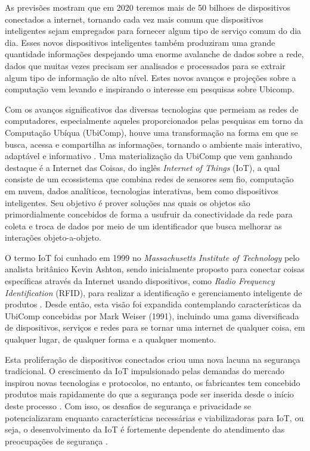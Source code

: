\documentclass[tid,table]{texufpel} %
\begin{document}
As previsões mostram que em 2020 teremos mais de 50 bilhoes de dispositivos conectados a internet, tornando cada vez mais comum que dispositivos inteligentes sejam empregados para fornecer algum tipo de serviço comum do dia dia. Esses novos dispositivos inteligentes também produziram uma grande quantidade  informações despejando uma enorme avalanche de dados sobre a rede, dados que muitas vezes precisam ser analisados e processados para se extrair algum tipo de informação de alto nível. Estes novos avanços e projeções sobre a computação vem levando e inspirando o interesse em pesquisas sobre Ubicomp. 






Com os avanços significativos das diversas tecnologias que permeiam as redes de computadores, especialmente aqueles proporcionados pelas pesquisas em torno da Computação Ubíqua (UbiComp), houve uma transformação na forma em que se busca, acessa e compartilha as informações, tornando o ambiente mais interativo, adaptável e informativo \cite{tweneboah17}. Uma materialização da UbiComp que vem ganhando destaque é a Internet das Coisas, do inglês \textit{Internet of Things} (IoT), a qual consiste de um ecossistema que combina redes de sensores sem fio, computação em nuvem, dados analíticos, tecnologias interativas, bem como dispositivos inteligentes. Seu objetivo é prover soluções nas quais os objetos são primordialmente concebidos de forma a usufruir da conectividade da rede para coleta e troca de dados por meio de um identificador que busca melhorar as interações objeto-a-objeto. 

O termo IoT foi cunhado em 1999 no \textit{Massachusetts Institute of Technology} pelo analista britânico Kevin Ashton, sendo inicialmente proposto para conectar coisas específicas através da Internet usando dispositivos, como \textit{Radio Frequency Identification} (RFID), para realizar a identificação e gerenciamento inteligente de produtos \cite{ashton09}. Desde então, esta visão foi expandida contemplando características da UbiComp concebidas por Mark Weiser (1991)\nocite{weiser91}, incluindo uma gama diversificada de dispositivos, serviços e redes para se tornar uma internet de qualquer coisa, em qualquer lugar, de qualquer forma e a qualquer momento. 

Esta proliferação de dispositivos conectados criou uma nova lacuna na segurança tradicional. O crescimento da IoT impulsionado pelas demandas do mercado inspirou novas tecnologias e protocolos, no entanto, os fabricantes tem concebido produtos mais rapidamente do que a segurança pode ser inserida desde o início deste processo \cite{sans17}. Com isso, os desafios de segurança e privacidade se potencializaram enquanto características necessárias e viabilizadoras para IoT, ou seja, o desenvolvimento da IoT é fortemente dependente do atendimento das preocupações de segurança \cite{sicari15}.
\end{document}
